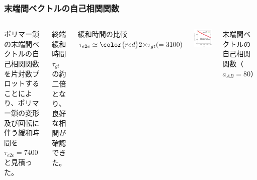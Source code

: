 \documentclass[12pt, dvipdfmx]{beamer}
\begin{document}
\begin{frame}
\frametitle{末端間ベクトルの自己相関関数}

\begin{columns}[T, totalwidth=\linewidth]
ポリマー鎖の末端間ベクトルの自己相関関数を片対数プロットすることにより、ポリマー鎖の変形及び回転に伴う緩和時間を $\tau_{e2e}=7400$ と見積った。

終端緩和時間 $\tau_{gt}$ の約二倍となり、良好な相関が確認できた。
\begin{block}{緩和時間の比較}
\centering
$\tau_{e2e} \simeq {\color{red} 2 \times} \tau_{gt} (=3100)$
\end{block}

	\includegraphics[width=\columnwidth]{./fig/AB80/E2Evec_80.pdf}

\centering
	末端間ベクトルの自己相関\\関数（$a_{AB} = 80$）
\end{columns}

\end{frame}
\end{document}
